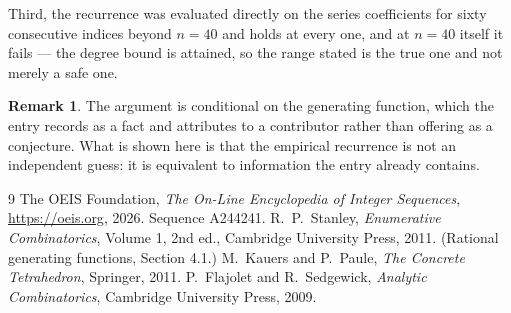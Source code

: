 \documentclass[11pt,a4paper]{article}
\theoremstyle{plain}
\theoremstyle{definition}
\newtheorem{remark}[theorem]{Remark}
\begin{document}
Third, the recurrence was evaluated directly on the series coefficients for sixty consecutive
indices beyond $n=40$ and holds at every one, and at $n=40$ itself it fails --- the
degree bound is attained, so the range stated is the true one and not merely a safe one.

\begin{remark}
The argument is conditional on the generating function, which the entry records as a fact and
attributes to a contributor rather than offering as a conjecture. What is shown here is that
the empirical recurrence is not an independent guess: it is equivalent to information the
entry already contains.
\end{remark}

\begin{thebibliography}{9}
 The OEIS Foundation, \emph{The On-Line Encyclopedia of Integer
Sequences}, \url{https://oeis.org}, 2026. Sequence A244241.
 R.~P.~Stanley, \emph{Enumerative Combinatorics}, Volume 1, 2nd ed.,
Cambridge University Press, 2011. (Rational generating functions, Section 4.1.)
 M.~Kauers and P.~Paule, \emph{The Concrete Tetrahedron}, Springer, 2011.
 P.~Flajolet and R.~Sedgewick, \emph{Analytic Combinatorics}, Cambridge
University Press, 2009.
\end{thebibliography}
\end{document}
